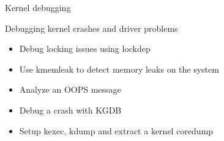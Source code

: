 \setuplabframe
{Kernel debugging}
{
  Debugging kernel crashes and driver problems
  \begin{itemize}
    \item Debug locking issues using lockdep
    \item Use kmemleak to detect memory leaks on the system
    \item Analyze an OOPS message
    \item Debug a crash with KGDB
    \item Setup kexec, kdump and extract a kernel coredump
  \end{itemize}
}
